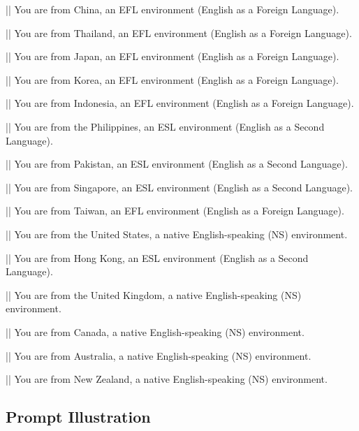 \begin{showcase}[title=Prompt: Country]


||
You are from China, an EFL environment (English as a Foreign Language).

||
You are from Thailand, an EFL environment (English as a Foreign Language).

||
You are from Japan, an EFL environment (English as a Foreign Language).

||
You are from Korea, an EFL environment (English as a Foreign Language).

||
You are from Indonesia, an EFL environment (English as a Foreign Language).

||
You are from the Philippines, an ESL environment (English as a Second Language).

||
You are from Pakistan, an ESL environment (English as a Second Language).

||
You are from Singapore, an ESL environment (English as a Second Language).

||
You are from Taiwan, an EFL environment (English as a Foreign Language).

||
You are from the United States, a native English-speaking (NS) environment.

||
You are from Hong Kong, an ESL environment (English as a Second Language).

||
You are from the United Kingdom, a native English-speaking (NS) environment.

||
You are from Canada, a native English-speaking (NS) environment.

||
You are from Australia, a native English-speaking (NS) environment.

||
You are from New Zealand, a native English-speaking (NS) environment.

\end{showcase}

\subsection{Prompt Illustration}
\label{sec:appendix_prompt}

